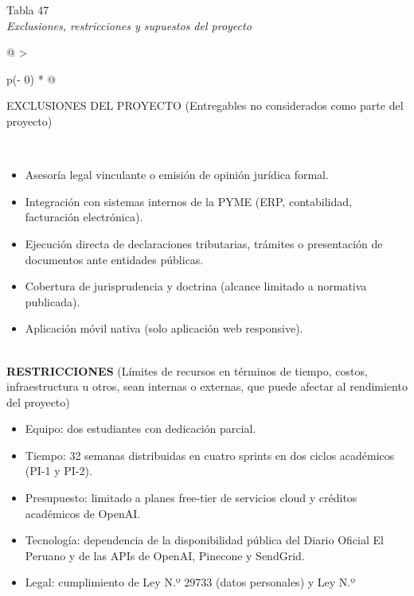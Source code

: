 \documentclass[12pt,a4paper,oneside]{report}
\begin{document}
\label{_Toc231672302}{}Tabla 47\\
\emph{Exclusiones, restricciones y supuestos del proyecto}

\begin{longtable}[]{@{}
  >{\raggedright\arraybackslash}p{(\columnwidth - 0\tabcolsep) * }@{}}
\toprule\noalign{}
\begin{minipage}[b]{\linewidth}\raggedright
EXCLUSIONES DEL PROYECTO (Entregables no considerados como parte del
proyecto)
\end{minipage} \\
\midrule\noalign{}
\endhead
\bottomrule\noalign{}
\endlastfoot
\begin{minipage}[t]{\linewidth}\raggedright
\begin{itemize}
\item
  Asesoría legal vinculante o emisión de opinión jurídica formal.
\item
  Integración con sistemas internos de la PYME (ERP, contabilidad,
  facturación electrónica).
\item
  Ejecución directa de declaraciones tributarias, trámites o
  presentación de documentos ante entidades públicas.
\item
  Cobertura de jurisprudencia y doctrina (alcance limitado a normativa
  publicada).
\item
  Aplicación móvil nativa (solo aplicación web responsive).
\end{itemize}
\end{minipage} \\
\textbf{RESTRICCIONES} (Límites de recursos en términos de tiempo,
costos, infraestructura u otros, sean internas o externas, que puede
afectar al rendimiento del proyecto) \\
\begin{minipage}[t]{\linewidth}\raggedright
\begin{itemize}
\item
  Equipo: dos estudiantes con dedicación parcial.
\item
  Tiempo: 32 semanas distribuidas en cuatro sprints en dos ciclos
  académicos (PI-1 y PI-2).
\item
  Presupuesto: limitado a planes free-tier de servicios cloud y créditos
  académicos de OpenAI.
\item
  Tecnología: dependencia de la disponibilidad pública del Diario
  Oficial El Peruano y de las APIs de OpenAI, Pinecone y SendGrid.
\item
  Legal: cumplimiento de Ley N.º 29733 (datos personales) y Ley N.º

\end{itemize}
\end{minipage}
\end{longtable}
\end{document}
